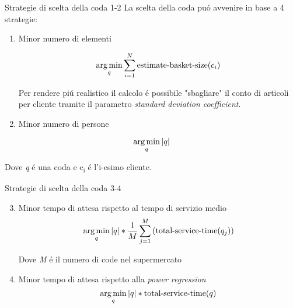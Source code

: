 \begin{frame}{Strategie di scelta della coda 1-2}
  La scelta della coda puó avvenire in base a 4 strategie:
  \begin{enumerate}
  \item Minor numero di elementi

    \begin{equation}
      \operatorname*{arg\,min}_q \sum\limits_{i=1}^N \text{estimate-basket-size}(c_i) 
    \end{equation}

    Per rendere piú realistico il calcolo é possibile "sbagliare"
    il conto di articoli per cliente tramite il parametro
    \textit{standard deviation coefficient}.
    
  \item Minor numero di persone
   \end{enumerate}
   
   \begin{equation}
     \operatorname*{arg\,min}_q |q|
   \end{equation}

   Dove \textit{q} é una coda e c\textsubscript{i} é l'i-esimo
   cliente.   
 \end{frame}

\begin{frame}{Strategie di scelta della coda 3-4}
  \begin{enumerate}
    \setcounter{enumi}{2}

  \item Minor tempo di attesa rispetto al tempo di servizio medio
    \begin{equation}
      \operatorname*{arg\,min}_q |q| * \frac{1}{M}\sum\limits_{j=1}^M \left( \text{total-service-time}(q_j) \right)
    \end{equation}

    Dove \textit{M} é il numero di code nel supermercato
    
\item Minor tempo di attesa rispetto alla \textit{power regression}
  \begin{equation}
    \operatorname*{arg\,min}_q |q| * \text{total-service-time}(q)
  \end{equation}
\end{enumerate}
\end{frame}


